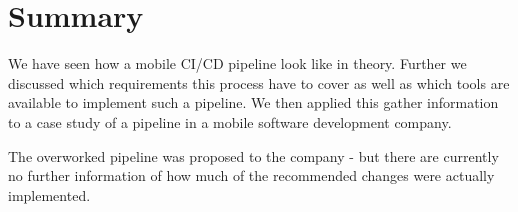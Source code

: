 \section{Summary}
We have seen how a mobile CI/CD pipeline look like in theory. Further we discussed which requirements this process have to cover as well as which tools are available to implement such a pipeline. We then applied this gather information to a case study of a pipeline in a mobile software development company. 

The overworked pipeline was proposed to the company - but there are currently no further information of how much of the recommended changes were actually implemented. 